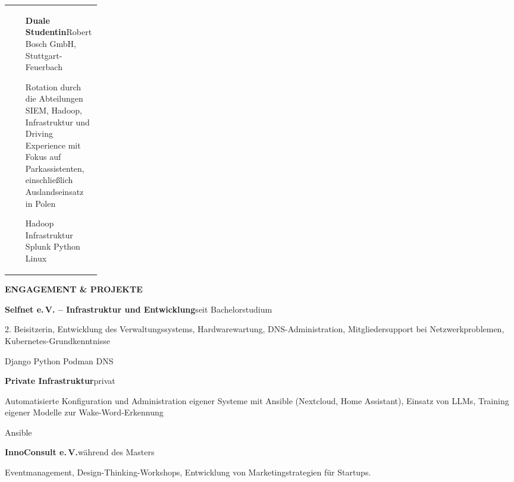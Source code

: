 \documentclass[10pt,a4paper]{article}
\makeatletter
\newcommand{\mainsection}[1]{%
  \vspace{2mm}%
  {\large\bfseries\textcolor{CVPrimary}{\MakeUppercase{#1}}}\par
  \vspace{0.8mm}{\color{CVRule}\rule{\linewidth}{0.6pt}}\vspace{1.2mm}
}
\newcommand{\entry}[4]{%
  \begin{tabularx}{\linewidth}{@{}>{\raggedright\arraybackslash}p{0.18\linewidth}@{\hspace{2.5mm}}X@{}}
    {\small\textcolor{CVMuted}{#1}} &
    {\bfseries #2}\hfill{\small\textcolor{CVMuted}{#3}}\par
    #4
  \end{tabularx}\vspace{1.2mm}
}
\newcommand{\compactentry}[3]{%
  {\bfseries #1}\hfill{\small\textcolor{CVMuted}{#2}}\par
  #3\par\vspace{1.7mm}
}
\newcommand{\tag}[1]{%
  \begingroup
  \setlength{\fboxsep}{1.4pt}%
  \colorbox{CVSoft}{\scriptsize\textcolor{CVPrimary}{#1}}%
  \endgroup\hspace{0.7mm}%
}
\makeatother
\begin{document}
\begin{minipage}[t]{0.68\textwidth}
  \entry{10/2021--09/2024}{Duale Studentin}{Robert Bosch GmbH, Stuttgart-Feuerbach}{
    Rotation durch die Abteilungen SIEM, Hadoop, Infrastruktur und Driving Experience mit Fokus auf
    Parkassistenten, einschließlich Auslandseinsatz in Polen\par
    \tag{Hadoop}\tag{Infrastruktur}\tag{Splunk}\tag{Python}\tag{Linux}
  }

  \mainsection{Engagement \& Projekte}

  \compactentry{Selfnet e.\,V. -- Infrastruktur und Entwicklung}{seit Bachelorstudium}{
    2. Beisitzerin, Entwicklung des Verwaltungssystems, Hardwarewartung,
    DNS-Administration, Mitgliedersupport bei Netzwerkproblemen,
    Kubernetes-Grundkenntnisse\par
    \tag{Django}\tag{Python}\tag{Podman}\tag{DNS}
  }

  \compactentry{Private Infrastruktur}{privat}{
    Automatisierte Konfiguration und Administration eigener Systeme mit Ansible
    (Nextcloud, Home Assistant), Einsatz von LLMs, Training eigener
    Modelle zur Wake-Word-Erkennung\par
    \tag{Ansible}
  }

  \compactentry{InnoConsult e.\,V.}{während des Masters}{
    Eventmanagement, Design-Thinking-Workshops, Entwicklung von Marketingstrategien für Startups.
  }
\end{minipage}
\end{document}
